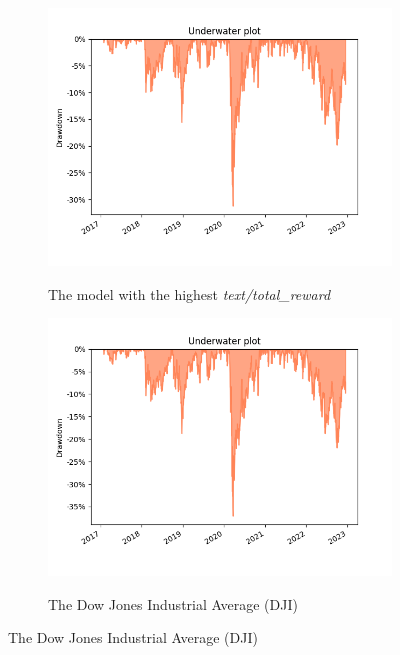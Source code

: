 \documentclass[../xlapes02]{subfiles}
\begin{document}
    \begin{figure}[h!]
        \begin{subfigure}[t]{\experimentimgwidth\textwidth}
            \centering
            \includegraphics[width=\linewidth]{image/figure/drawdown_underwater_max}
            \label{fig:drawdown_underwater_max}
            \caption{The model with the highest \emph{text/total\_reward}}
        \end{subfigure}
        \hfill
        \begin{subfigure}[t]{\experimentimgwidth\textwidth}
            \centering
            \includegraphics[width=\linewidth]{image/figure/drawdown_underwater_dji}
            \label{fig:drawdown_underwater_dji}
            \caption{The Dow Jones Industrial Average (DJI)}
        \end{subfigure}


\end{figure}
\end{document}
